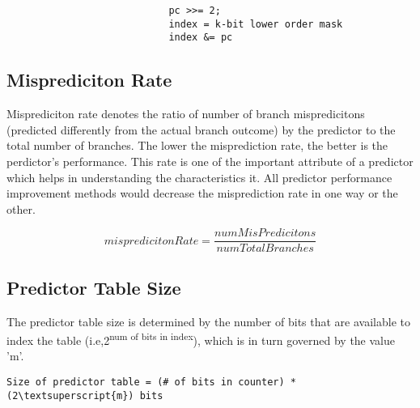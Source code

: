 \begin{verbatim}
                            pc >>= 2;
                            index = k-bit lower order mask
                            index &= pc
\end{verbatim}

\subsection{Misprediciton Rate}
Misprediciton rate denotes the ratio of number of branch mispredicitons (predicted differently from the actual branch outcome) by the predictor to the total number of branches. The lower the misprediction rate, the better is the perdictor's performance. This rate is one of the important attribute of a predictor which helps in understanding the characteristics it. All predictor performance improvement  methods would decrease the misprediction rate in one way or the other.

\[mispredicitonRate = \frac{numMisPredicitons}{numTotalBranches}\]

\subsection{Predictor Table Size}
The predictor table size is determined by the number of bits that are available to index the table (i.e,2\textsuperscript{num of bits in index}), which is in turn governed by the value 'm'. 

\begin{Verbatim}[commandchars=\\\{\},codes={\catcode`$=3\catcode`_=8}]
            Size of predictor table = (# of bits in counter) * (2\textsuperscript{m}) bits
\end{Verbatim}
